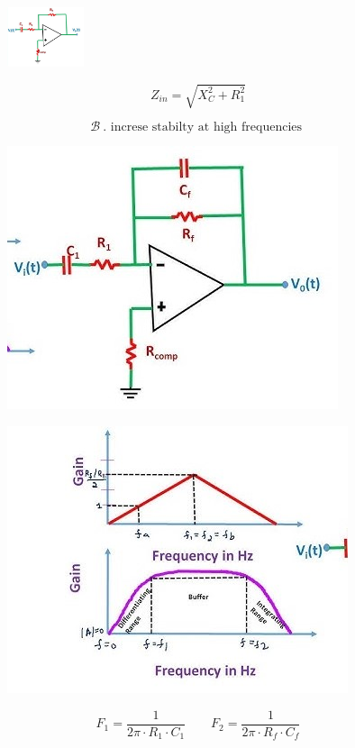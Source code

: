 \documentclass{article}
\begin{document}
\begin{figure}[h]
    \centering
    \includegraphics[width=0.2\textwidth]{practical2.jpg}    
\end{figure}
\[
Z_{in}=\sqrt{X_C^2 + R_1^2}
\]

\[
\mathcal{B} \ \text{. increse stabilty at high frequencies }
\]

\begin{figure}[h]
    \centering
    \includegraphics[width=.3\textwidth]{practical3.jpg}    
\end{figure}

\begin{figure}[h]
    \centering
    \includegraphics[width=.3\textwidth]{practical4.jpg}
\end{figure}

\[
F_1 =\frac{1}{2\pi \cdot R_1 \cdot C_1} \qquad
F_2 =\frac{1}{2\pi \cdot R_f \cdot C_f}
\]
\end{document}
